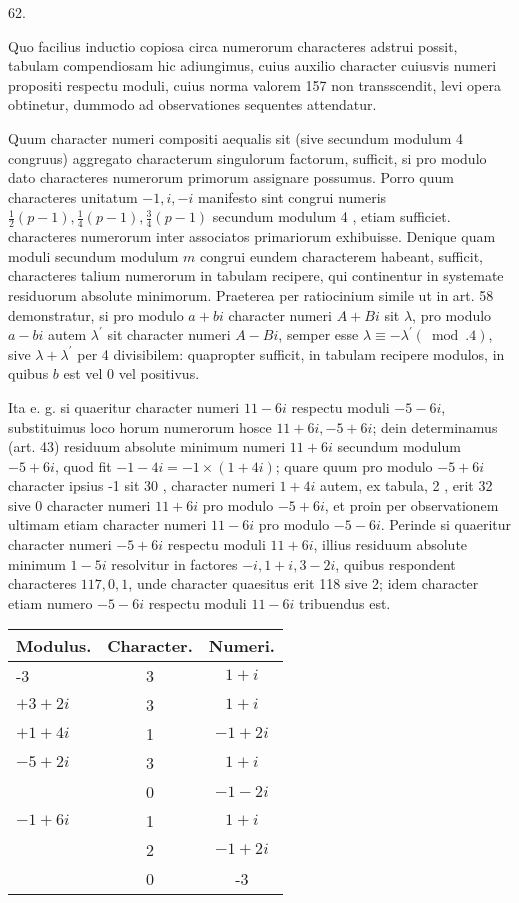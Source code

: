 \documentclass[10pt]{article}
\begin{document}
62.

Quo facilius inductio copiosa circa numerorum characteres adstrui possit, tabulam compendiosam hic adiungimus, cuius auxilio character cuiusvis numeri propositi respectu moduli, cuius norma valorem 157 non transscendit, levi opera obtinetur, dummodo ad observationes sequentes attendatur.

Quum character numeri compositi aequalis sit (sive secundum modulum 4 congruus) aggregato characterum singulorum factorum, sufficit, si pro modulo dato characteres numerorum primorum assignare possumus. Porro quum characteres unitatum \(-1, i,-i\) manifesto sint congrui numeris \(\frac{1}{2}(p-1), \frac{1}{4}(p-1), \frac{3}{4}(p-1)\) secundum modulum 4 , etiam sufficiet. characteres numerorum inter associatos primariorum exhibuisse. Denique quam moduli secundum modulum \(m\) congrui eundem characterem habeant, sufficit, characteres talium numerorum in tabulam recipere, qui continentur in systemate residuorum absolute minimorum. Praeterea per ratiocinium simile ut in art. 58 demonstratur, si pro modulo \(a+b i\) character numeri \(A+B i\) sit \(\lambda\), pro modulo \(a-b i\) autem \(\lambda^{\prime}\) sit character numeri \(A-B i\), semper esse \(\lambda \equiv-\lambda^{\prime}(\bmod .4)\), sive \(\lambda+\lambda^{\prime}\) per 4 divisibilem: quapropter sufficit, in tabulam recipere modulos, in quibus \(b\) est vel 0 vel positivus.

Ita e. g. si quaeritur character numeri \(11-6 i\) respectu moduli \(-5-6 i\), substituimus loco horum numerorum hosce \(11+6 i,-5+6 i\); dein determinamus (art. 43) residuum absolute minimum numeri \(11+6 i\) secundum modulum \(-5+6 i\), quod fit \(-1-4 i=-1 \times(1+4 i)\); quare quum pro modulo \(-5+6 i\) character ipsius -1 sit 30 , character numeri \(1+4 i\) autem, ex tabula, 2 , erit 32 sive 0 character numeri \(11+6 i\) pro modulo \(-5+6 i\), et proin per observationem ultimam etiam character numeri \(11-6 i\) pro modulo \(-5-6 i\). Perinde si quaeritur character numeri \(-5+6 i\) respectu moduli \(11+6 i\), illius residuum absolute minimum \(1-5 i\) resolvitur in factores \(-i, 1+i, 3-2 i\), quibus respondent characteres \(117,0,1\), unde character quaesitus erit 118 sive 2; idem character etiam numero \(-5-6 i\) respectu moduli \(11-6 i\) tribuendus est.

\begin{center}
\begin{tabular}{l|c|c}
Modulus. & Character. & Numeri. \\
\hline
-3 & 3 & \(1+i\) \\
\(+3+2 i\) & 3 & \(1+i\) \\
\(+1+4 i\) & 1 & \(-1+2 i\) \\
\(-5+2 i\) & 3 & \(1+i\) \\
 & 0 & \(-1-2 i\) \\
\(-1+6 i\) & 1 & \(1+i\) \\
 & 2 & \(-1+2 i\) \\
 & 0 & -3 \\
\hline
\end{tabular}
\end{center}
\end{document}
